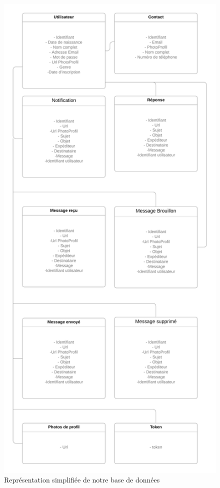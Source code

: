 \documentclass[french]{report}
\begin{document}
\begin{figure}[H]
	\centering
    \includegraphics[scale=0.18 ]{Représentation simplifiée de notre base de données}
    \caption{Représentation simplifiée de notre base de données}
    \label{fig:Representation}
\end{figure}
\end{document}
